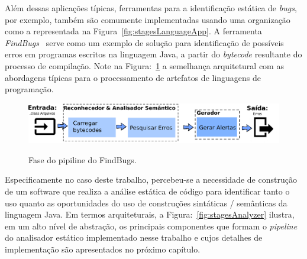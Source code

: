	



Al\'{e}m dessas aplica\c c\~{o}es t\'{i}picas, 
ferramentas para a identifica\c c\~{a}o est\'{a}tica de \emph{bugs}, por exemplo, tamb\'{e}m s\~{a}o comumente 
implementadas usando uma organiza\c c\~{a}o como a representada na Figura~\ref{fig:stagesLanguageApp}. 
A ferramenta \textit{FindBugs}~\cite{FindBugs} serve como um exemplo de solu\c c\~{a}o para identifica\c c\~{a}o 
de poss\'{i}veis erros em programas escritos na linguagem Java, a partir do \emph{bytecode} resultante do 
processo de compila\c c\~{a}o. Note na Figura:~\ref{fig:findBugs} a semelhan\c ca arquitetural com as 
abordagens t\'{i}picas para o processamento de artefatos de linguagens de programa\c c\~{a}o. 

\begin{figure}[h]
	\center
	\includegraphics[scale=0.9]{Imagens/pipelineFindbugs}
	\label{fig:findBugs}
	\caption{Fase do pipiline do FindBugs.}
\end{figure}


Especificamente no caso deste trabalho, percebeu-se a necessidade de constru\c{c}\~{a}o de um software que 
realiza a an\'{a}lise est\'{a}tica de c\'{o}digo para identificar tanto o uso quanto as oportunidades do uso de constru\c{c}\~{o}es 
sint\'{a}ticas / sem\^{a}nticas da linguagem Java. Em termos arquiteturais, a Figura:~\ref{fig:stagesAnalyzer} ilustra, 
em um alto n\'{i}vel de abstra\c c\~{a}o, os principais componentes que formam o \emph{pipeline} do analisador est\'{a}tico 
implementado nesse trabalho e cujos detalhes de implementa\c c\~{a}o s\~{a}o apresentados no pr\'{o}ximo cap\'{i}tulo.

